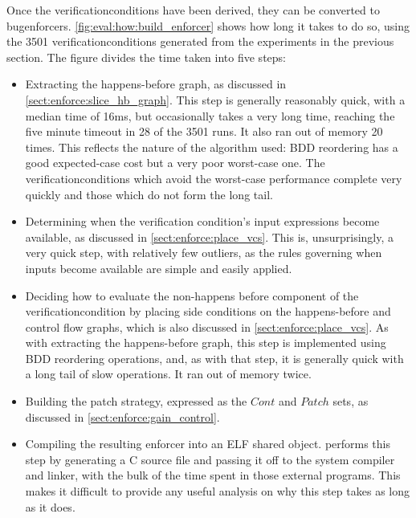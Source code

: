 Once the \glspl{verificationcondition} have been derived, they can be
converted to \glspl{bugenforcer}.
\autoref{fig:eval:how:build_enforcer} shows how long it takes to do
so, using the 3501 \glspl{verificationcondition} generated from the
experiments in the previous section.  The figure divides the time
taken into five steps:
\begin{itemize}
\item Extracting the happens-before graph, as discussed in
  \autoref{sect:enforce:slice_hb_graph}.  This step is generally
  reasonably quick, with a median time of 16ms, but occasionally takes
  a very long time, reaching the five minute timeout in 28 of the 3501
  runs.  It also ran out of memory 20 times.  This reflects the nature
  of the algorithm used: BDD reordering has a good expected-case cost
  but a very poor worst-case one.  The \glspl{verificationcondition}
  which avoid the worst-case performance complete very quickly and
  those which do not form the long tail.
\item Determining when the verification condition's input expressions
  become available, as discussed in \autoref{sect:enforce:place_vcs}.
  This is, unsurprisingly, a very quick step, with relatively few
  outliers, as the rules governing when inputs become available are
  simple and easily applied.
\item Deciding how to evaluate the non-happens before component of the
  \gls{verificationcondition} by placing side conditions on the
  happens-before and control flow graphs, which is also discussed in
  \autoref{sect:enforce:place_vcs}.  As with extracting
  the happens-before graph, this step is implemented using BDD
  reordering operations, and, as with that step, it is generally quick
  with a long tail of slow operations.  It ran
  out of memory twice.
\item Building the patch strategy, expressed as the $\mathit{Cont}$
  and $\mathit{Patch}$ sets, as discussed in
  \autoref{sect:enforce:gain_control}.  
\item Compiling the resulting enforcer into an ELF shared object.
  {\Implementation} performs this step by generating a C source file
  and passing it off to the system compiler and linker, with the bulk
  of the time spent in those external programs.  This makes it
  difficult to provide any useful analysis on why this step takes as
  long as it does.
\end{itemize}

